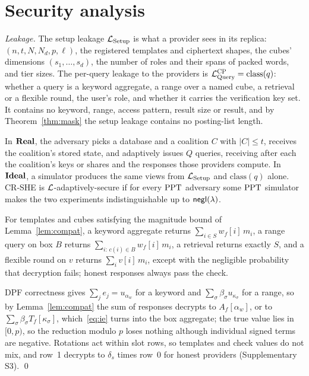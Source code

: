 \section{Security analysis}
\label{sec:security}

\emph{Leakage.} The setup leakage $\mathcal{L}_{\mathrm{Setup}}$ is what a provider
sees in its replica: $(n,t,N,N_d,p,\ell)$, the registered templates and
ciphertext shapes, the cubes' dimensions $(s_1,\dots,s_d)$, the number of roles
and their spans of packed words, and tier sizes. The per-query leakage to the
providers is $\mathcal{L}^{\text{CP}}_{\mathrm{Query}}=\mathrm{class}(q)$: whether a
query is a keyword aggregate, a range over a named cube, a retrieval or a
flexible round, the user's role, and whether it carries the verification key
set. It contains no keyword, range, access pattern, result size or result, and
by Theorem~\ref{thm:mask} the setup leakage contains no posting-list length.

\begin{definition}
\label{def:sec}
In $\mathbf{Real}$, the adversary picks a database and a coalition $C$ with $|C|\le t$,
receives the coalition's stored state, and adaptively issues $Q$ queries,
receiving after each the coalition's keys or shares and the responses those
providers compute. In $\mathbf{Ideal}$, a simulator produces the same views from
$\mathcal{L}_{\mathrm{Setup}}$ and $\mathrm{class}(q)$ alone. CR-SHE is
$\mathcal{L}$-adaptively-secure if for every $\mathrm{PPT}$ adversary some $\mathrm{PPT}$ simulator
makes the two experiments indistinguishable up to $\mathsf{negl}(\lambda)$.
\end{definition}

\begin{theorem}[Correctness]
\label{thm:correct}
For templates and cubes satisfying the magnitude bound of
Lemma~\ref{lem:compat}, a keyword aggregate returns $\sum_{i\in S}w_f[i]\,m_i$,
a range query on box $B$ returns $\sum_{i:\,c(i)\in B}w_f[i]\,m_i$, a retrieval
returns exactly $S$, and a flexible round on $v$ returns $\sum_iv[i]\,m_i$,
except with the negligible probability that decryption fails; honest
responses always pass the check.
\end{theorem}
\begin{pf}
DPF correctness gives $\sum_je_j=u_{\alpha_w}$ for a keyword and
$\sum_\sigma\beta_\sigma u_{\kappa_\sigma}$ for a range, so by
Lemma~\ref{lem:compat} the sum of responses decrypts to $A_f[\alpha_w]$, or to
$\sum_\sigma\beta_\sigma T_f[\kappa_\sigma]$, which~\eqref{eq:ie} turns into
the box aggregate; the true value lies in $[0,p)$, so the reduction modulo $p$
loses nothing although individual signed terms are negative. Rotations act
within slot rows, so templates and check values do not mix, and row~1 decrypts
to $\delta_s$ times row~0 for honest providers (Supplementary S3). \qed
\end{pf}

